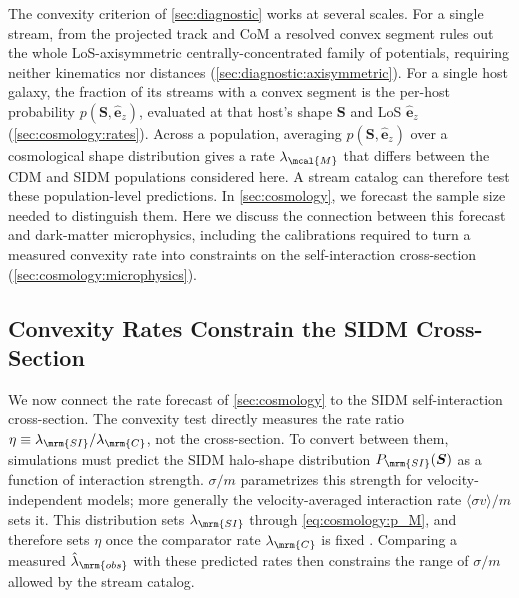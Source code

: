 \documentclass[linenumbers,twocolumn]{aastex701}
\renewcommand{\mbf}[1]{\boldsymbol{#1}}
\newcommand{\zhat}{\hat{\mbf{e}}_z} %
\newcommand{\lamM}{\ensuremath{\lambda_{\mcal{M}}}}   %
\newcommand{\lamC}{\ensuremath{\lambda_{\mrm{C}}}}    %
\newcommand{\lamSI}{\ensuremath{\lambda_{\mrm{SI}}}}  %
\newcommand{\lamObs}{\ensuremath{\hat{\lambda}_{\mrm{obs}}}}  %
\begin{document}
    The convexity criterion of \autoref{sec:diagnostic} works at several scales. %
    For a single stream, from the projected track and \gls{CoM} a resolved convex segment rules out the whole \gls{LoS}-axisymmetric centrally-concentrated family of potentials, requiring neither kinematics nor distances (\autoref{sec:diagnostic:axisymmetric}). %
    For a single host galaxy, the fraction of its streams with a convex segment is the per-host probability $p(\mbf{S},\zhat)$, evaluated at that host's shape $\mbf{S}$ and \gls{LoS} $\zhat$ (\autoref{sec:cosmology:rates}). %
    Across a population, averaging $p(\mbf{S},\zhat)$ over a cosmological shape distribution gives a rate $\lamM$ that differs between the \gls{CDM} and \gls{SIDM} populations considered here. %
    A stream catalog can therefore test these population-level predictions. %
    In \autoref{sec:cosmology}, we forecast the sample size needed to distinguish them. %
    Here we discuss the connection between this forecast and dark-matter microphysics, including the calibrations required to turn a measured convexity rate into constraints on the self-interaction cross-section (\autoref{sec:cosmology:microphysics}). %


    \subsection{Convexity Rates Constrain the SIDM Cross-Section}\label{sec:cosmology:microphysics}

        We now connect the rate forecast of \autoref{sec:cosmology} to the \gls{SIDM} self-interaction cross-section. %
        The convexity test directly measures the rate ratio $\eta\equiv\lamSI/\lamC$, not the cross-section. %
        To convert between them, simulations must predict the \gls{SIDM} halo-shape distribution $P_{\mrm{SI}}(\mbf{S})$ as a function of interaction strength. %
        $\sigma/m$ parametrizes this strength for velocity-independent models; more generally the velocity-averaged interaction rate $\langle\sigma v\rangle/m$ sets it. %
        This distribution sets $\lamSI$ through \cref{eq:cosmology:p_M}, and therefore sets $\eta$ once the comparator rate $\lamC$ is fixed \citep[for reviews see][]{Tulin+Yu:2018:DarkMatterSelfinteractions,Adhikari+:2025:AstrophysicalTestsDark}. %
        Comparing a measured $\lamObs$ with these predicted rates then constrains the range of $\sigma/m$ allowed by the stream catalog. %
\end{document}
